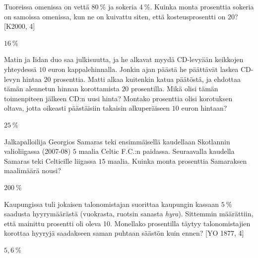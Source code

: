\begin{tehtavasivu}
\begin{tehtava}
    Tuoreissa omenissa on vettä $80~\%$ ja sokeria $4~\%$. Kuinka monta prosenttia sokeria
    on samoissa omenissa, kun ne on kuivattu siten, että kosteusprosentti on $20$? [K2000, 4]
    \begin{vastaus}
        $16~\%$
    \end{vastaus}
\end{tehtava}

\begin{tehtava}
    Matin ja Iidan duo saa julkisuutta, ja he alkavat myydä CD-levyään keikkojen yhteydessä $10$ euron
    kappalehinnalla. Jonkin ajan päästä he päättävät laskea CD-levyn hintaa $20$ prosenttia. Matti alkaa
    kuitenkin katua päätöstä, ja ehdottaa tämän alennetun hinnan korottamista $20$ prosentilla. Mikä olisi
    tämän toimenpiteen jälkeen CD:n uusi hinta? Montako prosenttia olisi korotuksen oltava, jotta oikeasti
    päästäisiin takaisin alkuperäiseen $10$ euron hintaan?
    \begin{vastaus}
        $25~\%$
    \end{vastaus}
\end{tehtava}

\begin{tehtava}
    Jalkapalloilija Georgios Samaras teki ensimmäisellä kaudellaan Skotlannin valioliigassa (2007-08)
    $5$ maalia Celtic F.C.:n paidassa. Seuraavalla kaudella Samaras teki Celticille liigassa $15$ maalia.
    Kuinka monta prosenttia Samaraksen maalimäärä nousi?
    \begin{vastaus}
        $200~\%$
    \end{vastaus}
\end{tehtava}

\begin{tehtava}
    Kaupungissa tuli jokaisen talonomistajan suorittaa kaupungin kassaan $5~\%$ saadusta
    hyyrymäärästä (vuokrasta, ruotsin sanasta \textit{hyra}). Sittemmin määrättiin, että mainittu
    prosentti oli oleva 10. Monellako prosentilla täytyy talonomistajien korottaa hyyryjä
    saadakseen saman puhtaan säästön kuin ennen? [YO 1877, 4]
    \begin{vastaus}
        $5,6~\%$
    \end{vastaus}
\end{tehtava}

\end{tehtavasivu}

